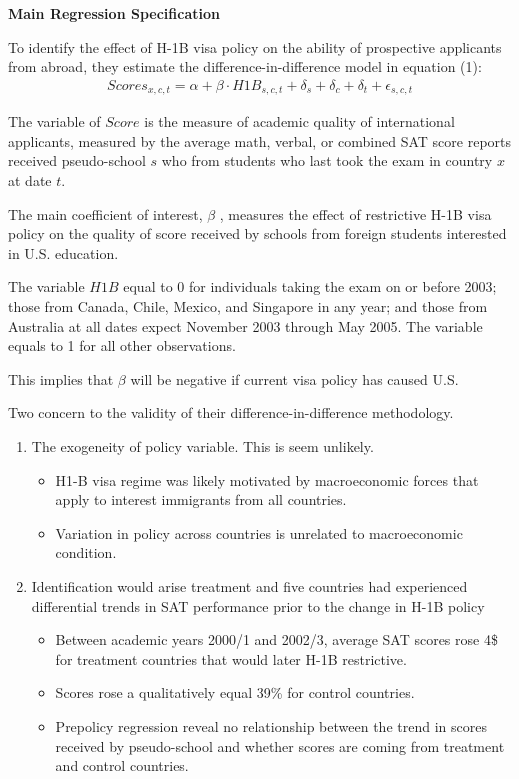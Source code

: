\documentclass[../root]{subfiles}
\begin{document}
   {\bf Main Regression Specification}
   
   To identify the effect of H-1B visa policy on the ability of prospective applicants from abroad, they estimate the difference-in-difference model in equation (1):
   \begin{align}
       Scores_{x,c,t} = \alpha + \beta \cdot H1B_{s,c,t} +\delta_s + \delta_c+\delta_t + \epsilon_{s,c,t}
   \end{align}
   
   The variable of $Score$ is the measure of academic quality of international applicants, measured by the average math, verbal, or combined SAT score reports received pseudo-school $s$ who from students who last took the exam in country $x$ at date $t$.
   
   The  main coefficient of interest, $\beta$ , measures the effect of restrictive H-1B visa policy on the quality of score received by schools from foreign students interested in U.S. education.
   
   The variable $H1B$ equal to 0 for individuals taking the exam on or before 2003; those from Canada, Chile, Mexico, and Singapore in any year; and those from Australia at all dates expect November 2003 through May 2005. The variable equals to 1 for all other observations.  
   
   This implies that $\beta$ will be negative if current visa policy has caused U.S.
   
   Two concern to the validity of their difference-in-difference methodology.
   
   \begin{enumerate}
       \item The exogeneity of policy variable. This is seem unlikely. 
       \begin{itemize}
            \item H1-B visa regime was likely motivated by macroeconomic forces that apply to interest immigrants from all countries.
            \item Variation in policy across countries is unrelated to macroeconomic condition.
         \end{itemize}
         \item Identification would arise treatment and five countries had experienced differential trends in SAT performance prior to the change in H-1B policy 
         \begin{itemize}
            \item Between academic years 2000/1 and 2002/3, average SAT scores rose 4\$ for treatment countries that would later H-1B restrictive.
            \item Scores rose a qualitatively equal 39\% for control countries.
            \item Prepolicy regression reveal no relationship between the trend in scores received by pseudo-school and whether scores are coming from treatment and control countries. 
         \end{itemize}
   \end{enumerate}
\end{document}
